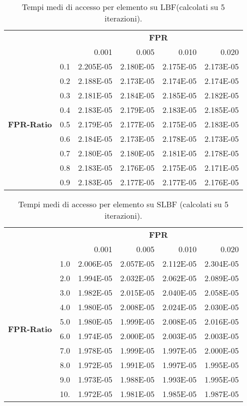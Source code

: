 \documentclass[4apaper,11pt]{report}
\begin{document}
    \begin{table}[H]
        \centering
        \begin{tabular}{llrrrr}
        \toprule
        {} & & \multicolumn{4}{c}{\textbf{FPR}}\\
        {} & &    0.001 &     0.005 &     0.010 &     0.020 \\
        \midrule
        \multirow{9}{*}{\textbf{FPR-Ratio}} & 0.1& 2.205E-05 & 2.180E-05 & 2.175E-05 & 2.173E-05 \\
        &0.2& 2.188E-05 & 2.173E-05 & 2.174E-05 & 2.174E-05 \\
        &0.3& 2.181E-05 & 2.184E-05 & 2.185E-05 & 2.182E-05 \\
        &0.4& 2.183E-05 & 2.179E-05 & 2.183E-05 & 2.185E-05 \\
        &0.5& 2.179E-05 & 2.177E-05 & 2.175E-05 & 2.183E-05 \\
        &0.6& 2.184E-05 & 2.173E-05 & 2.178E-05 & 2.173E-05 \\
        &0.7& 2.180E-05 & 2.180E-05 & 2.181E-05 & 2.178E-05 \\
        &0.8& 2.183E-05 & 2.176E-05 & 2.175E-05 & 2.171E-05 \\
        &0.9& 2.183E-05 & 2.177E-05 & 2.177E-05 & 2.176E-05 \\
        \bottomrule
        \end{tabular}
        \caption{Tempi medi di accesso per elemento su LBF(calcolati su 5 iterazioni).}
    \end{table}

    \begin{table}[H]
        \centering
        \begin{tabular}{llrrrr}
        \toprule
        {} & & \multicolumn{4}{c}{\textbf{FPR}}\\
        {} &  &   0.001 &     0.005 &     0.010 &     0.020 \\
        \midrule
        \multirow{10}{*}{\textbf{FPR-Ratio}} &1.0 & 2.006E-05 & 2.057E-05 & 2.112E-05 & 2.304E-05 \\
        &2.0 & 1.994E-05 & 2.032E-05 & 2.062E-05 & 2.089E-05 \\
        &3.0 & 1.982E-05 & 2.015E-05 & 2.040E-05 & 2.058E-05 \\
        &4.0 & 1.980E-05 & 2.008E-05 & 2.024E-05 & 2.030E-05 \\
        &5.0 & 1.980E-05 & 1.999E-05 & 2.008E-05 & 2.016E-05 \\
        &6.0 & 1.974E-05 & 2.000E-05 & 2.003E-05 & 2.003E-05 \\
        &7.0 & 1.978E-05 & 1.999E-05 & 1.997E-05 & 2.000E-05 \\
        &8.0 & 1.972E-05 & 1.991E-05 & 1.997E-05 & 1.995E-05 \\
        &9.0 & 1.973E-05 & 1.988E-05 & 1.993E-05 & 1.995E-05 \\
        &10. & 1.972E-05 & 1.981E-05 & 1.985E-05 & 1.987E-05 \\
        \bottomrule
        \end{tabular}
        \caption{Tempi medi di accesso per elemento su SLBF (calcolati su 5 iterazioni).}
    \end{table}
\end{document}
